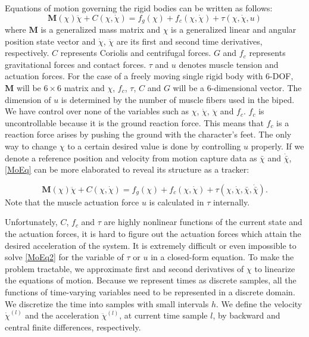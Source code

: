 \documentclass[master,english,final]{kaist-ucs}
\begin{document}
Equations of motion governing the rigid bodies can be written as follows:
\begin{equation}\label{MoEq}
\mathbf{M}(\chi)\ddot\chi + C(\chi,\dot\chi ) = f_g(\chi) + f_c(\chi, \dot\chi) + \tau (\chi, \dot\chi, u)
\end{equation}
where $\mathbf{M}$ is a generalized mass matrix and $\chi$ is a generalized
linear and angular position
state vector and $\dot\chi$, $\ddot\chi$ are its first and second time derivatives,
respectively. $C$ represents Coriolis and centrifugal forces.
$G$ and $f_c$ represents gravitational forces and contact forces.
$\tau$ and $u$ denotes muscle tension and actuation forces.
For the case of a freely moving single
rigid body with 6-DOF, $\mathbf{M}$ will be $6\times 6$ matrix and $\chi$,
$f_c$, $\tau$, $C$ and $G$ will be a 6-dimensional vector. The dimension of $u$ is
determined by the number of muscle fibers used in the biped. We have control
over none of the variables such as $\chi$, $\dot\chi$, $\ddot\chi$ and $f_c$.
$f_c$ is uncontrollable because it is the ground reaction force. This means that
$f_c$ is a reaction force arises by pushing the ground with the character's feet.
The only way to change $\chi$ to a certain desired value is done by controlling $u$
properly. If we denote a reference position and velocity from motion capture data
as $\bar\chi$ and $\dot{\bar\chi}$, \eqref{MoEq} can be more elaborated
to reveal its structure as a tracker:

\begin{equation}\label{MoEq2}
\mathbf{M}(\chi)\ddot\chi + C(\chi,\dot\chi ) = f_g(\chi) + f_c(\chi, \dot\chi ) + \tau (\chi, \dot\chi, \bar\chi, \dot{\bar\chi}).
\end{equation}
Note that the muscle actuation force $u$ is calculated in $\tau$ internally.

Unfortunately, $C$, $f_c$ and $\tau$ are highly nonlinear functions of the current state and the
actuation forces, it is hard to figure out the actuation forces which attain
the desired acceleration of the system. It is extremely difficult or even impossible
to solve \eqref{MoEq2} for the variable of $\tau$ or $u$ in a closed-form
equation.
To make the problem tractable, we approximate first and
second derivatives of $\chi$ to linearize the equations of motion.
Because we represent times as discrete samples, all the functions of
time-varying variables need to be represented in a discrete domain.
We discretize the time into samples with small intervals $h$. We define
the velocity $\dot\chi^{(l)}$ and the acceleration $\ddot\chi^{(l)}$, at current
time sample $l$, by backward and central finite differences, respectively.
\end{document}
